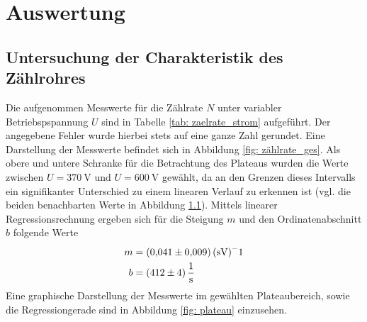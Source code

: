 \section{Auswertung}


\subsection{Untersuchung der Charakteristik des Zählrohres}
Die aufgenommen Messwerte für die Zählrate $N$ unter variabler Betriebspspannung $U$ sind
in Tabelle \ref{tab: zaelrate_strom} aufgeführt. Der angegebene Fehler wurde hierbei stets
auf eine ganze Zahl gerundet. Eine Darstellung der Messwerte befindet sich in Abbildung \ref{fig: zählrate_ges}.
Als obere und untere Schranke für die Betrachtung des Plateaus wurden die Werte zwischen $U = \SI{370}{\volt}$
und $U = \SI{600}{\volt}$ gewählt, da an den Grenzen dieses Intervalls ein signifikanter Unterschied zu einem
linearen Verlauf zu erkennen ist (vgl. die beiden benachbarten Werte in Abbildung \ref{}). Mittels linearer
Regressionsrechnung ergeben sich für die Steigung $m$ und den Ordinatenabschnitt $b$ folgende Werte
\begin{align}
  m &= \SI{0.041 \pm 0.009}{(\second\volt)^-1} \\
  b &= \SI{412 \pm 4}{\per\second}
\end{align}
Eine graphische Darstellung der Messwerte im gewählten Plateaubereich, sowie die Regressiongerade sind in
Abbildung \ref{fig: plateau} einzusehen.

